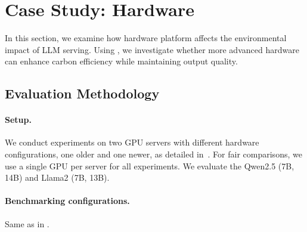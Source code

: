 \section{Case Study: Hardware}\label{sec:case3} 

In this section, we examine how hardware platform affects the environmental impact of LLM serving. Using \SYSTEM{}, we investigate whether more advanced hardware can enhance carbon efficiency while maintaining output quality.

\subsection{Evaluation Methodology}

\paragraph{Setup.} We conduct experiments on two GPU servers with different hardware configurations, one older and one newer, as detailed in~. For fair comparisons, we use a single GPU per server for all experiments. We evaluate the Qwen2.5 (7B, 14B) and Llama2 (7B, 13B).

\paragraph{Benchmarking configurations.} Same as in .

